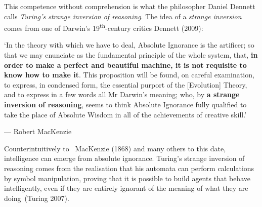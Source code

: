 \documentclass[
  letterpaper,
  12pt,
  british]{tufte-book}
\renewenvironment{quote}{
  \list{}{\leftmargin=3.5cm\topsep=0pt}
  \item\relax\small\itshape
}
{\endlist}
\theoremstyle{plain}
\theoremstyle{plain}
\theoremstyle{definition}
\theoremstyle{remark}
\begin{document}
This competence without comprehension is what the philosopher Daniel
Dennett calls \emph{Turing's strange inversion of reasoning}. The idea of a \emph{strange inversion} comes from one of
Darwin's 19\textsuperscript{th}-century critics Dennett
(2009):

\begin{quote}
`In the theory with which we have to deal, Absolute Ignorance is the
artificer; so that we may enunciate as the fundamental principle of the
whole system, that, \textbf{in order to make a perfect and beautiful
machine, it is not requisite to know how to make it}. This proposition
will be found, on careful examination, to express, in condensed form,
the essential purport of the {[}Evolution{]} Theory, and to express in a
few words all Mr Darwin's meaning; who, by \textbf{a strange inversion
of reasoning}, seems to think Absolute Ignorance fully qualified to take
the place of Absolute Wisdom in all of the achievements of creative
skill.'

--- Robert MacKenzie\\
\end{quote}

Counterintuitively to ~MacKenzie
(1868)
and many others to this date, intelligence can emerge from absolute
ignorance. Turing's strange inversion of reasoning comes from the
realisation that his automata can perform calculations by symbol
manipulation, proving that it is possible to build agents that behave
intelligently, even if they are entirely ignorant of the meaning of what
they are doing~(Turing
2007).
\end{document}
